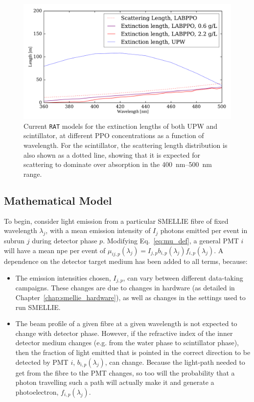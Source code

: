 \begin{figure}
    \centering
    \includegraphics[width=\textwidth]{5_SMELLIEAnalysis/images/ext_length_expectations_RAT_nice.pdf}
    \caption[Current \texttt{RAT} models for the extinction lengths of both UPW and scintillator, as a function of wavelength]
    {Current \texttt{RAT} models for the extinction lengths of both UPW and scintillator, at different PPO concentrations as a function of wavelength. For the scintillator, the scattering length distribution is also shown as a dotted line, showing that it is expected for scattering to dominate over absorption in the \SIrange{400}{500}{\nm} range.}
    \label{fig:smellie_expected_ext_length_phases}
\end{figure}

\subsection{Mathematical Model}
To begin, consider light emission from a particular SMELLIE fibre of fixed wavelength $\lambda_{j}$, with a mean emission intensity of $I_{j}$ photons emitted per event in subrun $j$ during detector phase $p$. Modifying Eq.~\ref{eq:mu_def}, a general PMT $i$ will have a mean npe per event of $\mu_{ij,p}(\lambda_{j}) = I_{j,p}b_{i,p}(\lambda_{j})f_{i,p}(\lambda_{j})$. A dependence on the detector target medium has been added to all terms, because:
\begin{itemize}
    \item The emission intensities chosen, $I_{j,p}$, can vary between different data-taking campaigns. These changes are due to changes in hardware (as detailed in Chapter~\ref{chap:smellie_hardware}), as well as changes in the settings used to run SMELLIE.
    \item The beam profile of a given fibre at a given wavelength is not expected to change with detector phase. However, if the refractive index of the inner detector medium changes (e.g. from the water phase to scintillator phase), then the fraction of light emitted that is pointed in the correct direction to be detected by PMT $i$, $b_{i,p}(\lambda_{j})$, can change. Because the light-path needed to get from the fibre to the PMT changes, so too will the probability that a photon travelling such a path will actually make it and generate a photoelectron, $f_{i,p}(\lambda_{j})$.
\end{itemize}

